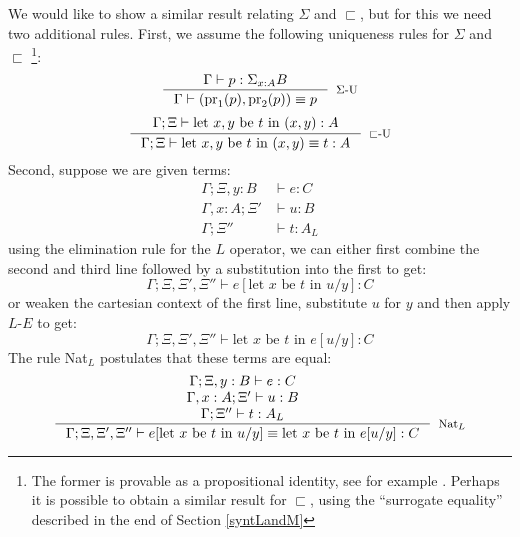 We would like to show a similar result relating $\Sigma$ and $\sqsubset$, but for this we need two additional rules. First, we assume the following uniqueness rules for $\Sigma$ and $\sqsubset$ \footnote{The former is provable as a propositional identity, see for example \cite[Corollary~2.7.3]{hott-book}. Perhaps it is possible to obtain a similar result for $\sqsubset$, using the ``surrogate equality'' described in the end of Section \ref{syntLandM}}:
\[
  \inference{\Gamma \vdash p : \Sigma_{x : A}B}
  {\Gamma \vdash (\text{pr}_1(p), \text{pr}_2(p)) \equiv p}[$\Sigma$-U]
\]
\[
  \inference{\Gamma;\Xi \vdash \text{let $x, y$ be $t$ in $(x, y) : A$}}
  {\Gamma;\Xi \vdash \text{let $x, y$ be $t$ in $(x, y) \equiv t : A$}}[$\sqsubset$-U]
\]
Second, suppose we are given terms:
\[
  \begin{split}
    \Gamma; \Xi, y : B &\vdash e : C\\
    \Gamma, x : A; \Xi' &\vdash u : B\\
    \Gamma; \Xi'' &\vdash t : A_L
  \end{split}
\]
using the elimination rule for the $L$ operator, we can either first combine the second and third line followed by a substitution into the first to get:
\[
  \Gamma; \Xi, \Xi', \Xi'' \vdash e[\text{let $x$ be $t$ in $u$}/y] : C
\]
or weaken the cartesian context of the first line, substitute $u$ for $y$ and then apply $L$-$E$ to get:
\[
  \Gamma; \Xi, \Xi', \Xi'' \vdash \text{let $x$ be $t$ in $e[u/y]$} : C
\]
The rule Nat$_L$ postulates that these terms are equal:
\[
  \inference{
    \Gamma; \Xi, y : B \vdash e : C\\
    \Gamma, x : A; \Xi'\vdash u : B\\
    \Gamma; \Xi'' \vdash t : A_L
}
{ \Gamma; \Xi, \Xi', \Xi'' \vdash e[\text{let $x$ be $t$ in $u$}/y] \equiv \text{let $x$ be $t$ in $e[u/y]$} : C}[Nat$_L$]
\]
